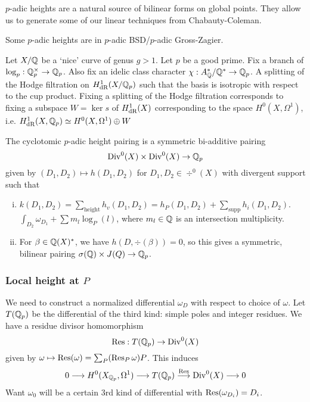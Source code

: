 $p$-adic heights are a natural source of bilinear forms on global points. They allow us to generate some of our linear techniques from Chabauty-Coleman.


\begin{rem}
Some $p$-adic heights are in $p$-adic BSD/$p$-adic Gross-Zagier.
\end{rem}


Let $X/\mathbb{Q}$ be a `nice' curve of genus $g>1$. Let $p$ be a good prime. Fix a branch of $\log_p: \mathbb{Q}_p^\times \to \mathbb{Q}_p$. Also fix an idelic class character $\chi: A_{\mathbb{Q}}^*/\mathbb{Q}^* \to \mathbb{Q}_p$. A splitting of the Hodge filtration on $H_{\text{dR}}^1(X/\mathbb{Q}_p)$ such that the basis is isotropic with respect to the cup product. Fixing a splitting of the Hodge filtration corresponds to fixing a subspace $W= \ker s$ of $H^1_{\text{dR}}(X)$ corresponding to the space $H^0(X,\Omega^1)$, i.e. $H^1_{\text{dR}}(X,\mathbb{Q}_p) \simeq H^0(X,\Omega^1) \oplus W$


\begin{dfn}
The cyclotomic $p$-adic height pairing is a symmetric bi-additive pairing
	\[
	\operatorname{Div}^0(X) \times \operatorname{Div}^0(X) \to \mathbb{Q}_p
	\]
given by $(D_1,D_2) \mapsto h(D_1,D_2)$ for $D_1,D_2 \in \div^0(X)$ with divergent support such that

\begin{enumerate}[(i)]
\item $k(D_1,D_2)= \sum_{\text{height}} h_v (D_1,D_2)= h_P(D_1,D_2) + \sum_{\text{supp}} h_i (D_1,D_2)$. $\int_{D_2} \omega_{D_1} + \sum m_l \log_P (l)$, where $m_l \in \mathbb{Q}$ is an intersection multiplicity. 
\item For $\beta \in \mathbb{Q}(X)^*$, we have $h(D,\div(\beta))=0$, so this gives a symmetric, bilinear pairing $\sigma(\mathbb{Q}) \times J(Q) \to \mathbb{Q}_p$.
\end{enumerate}
\end{dfn}
 


\subsubsection{Local height at $P$}

We need to construct a normalized differential $\omega_D$ with respect to choice of $\omega$. Let $T(\mathbb{Q}_p)$ be the differential of the third kind: simple poles and integer residues. We have a residue divisor homomorphism
	\[
	\operatorname{Res}: T(\mathbb{Q}_p) \to \operatorname{Div}^0(X)
	\]
given by $\omega \mapsto \operatorname{Res}(\omega) = \sum_P (\operatorname{Res}_P \omega) P$. This induces
	\[
	0 \stackrel{}{\longrightarrow} H^0(X_{\mathbb{Q}_p}, \Omega^1) \stackrel{}{\longrightarrow} T(\mathbb{Q}_p) \stackrel{\operatorname{Res}}{\longrightarrow} \operatorname{Div}^0(X) \stackrel{}{\longrightarrow} 0
	\]
Want $\omega_0$ will be a certain 3rd kind of differential with $\operatorname{Res}(\omega_{D_i})= D_i$. 


